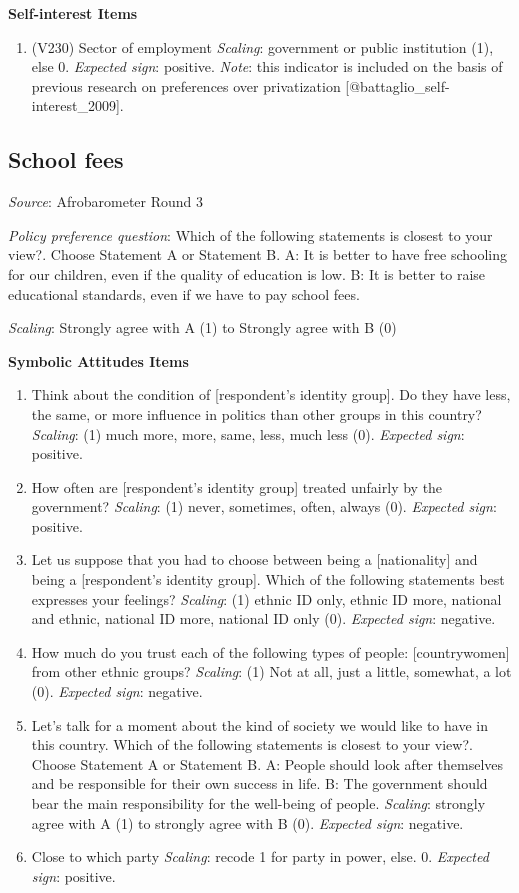 \documentclass[]{article}
\begin{document}
\textbf{Self-interest Items }

\begin{enumerate}
 \item (V230) Sector of employment \textit{Scaling}: government or public institution (1), else 0. \textit{Expected sign}: positive. \textit{Note}: this indicator is included on the basis of previous research on preferences over privatization [@battaglio_self-interest_2009].
\end{enumerate}

\subsection{School fees}\label{school-fees}

\textit{Source}: Afrobarometer Round 3

\textit{Policy preference question}: Which of the following statements
is closest to your view?. Choose Statement A or Statement B. A: It is
better to have free schooling for our children, even if the quality of
education is low. B: It is better to raise educational standards, even
if we have to pay school fees.

\textit{Scaling}: Strongly agree with A (1) to Strongly agree with B (0)

\textbf{Symbolic Attitudes Items}

\begin{enumerate}
  \item Think about the condition of [respondent’s identity group]. Do they have less, the same, or more influence in politics than other groups in this country? \textit{Scaling}: (1) much more, more, same, less, much less (0).  \textit{Expected sign}: positive.
  \item How often are [respondent’s identity group] treated unfairly by the government? \textit{Scaling}: (1) never, sometimes, often, always (0).  \textit{Expected sign}: positive.
  \item Let us suppose that you had to choose between being a [nationality] and being a [respondent’s identity group]. Which of the following statements best expresses your feelings? \textit{Scaling}: (1) ethnic ID only, ethnic ID more, national and ethnic, national ID more, national ID only (0).  \textit{Expected sign}: negative.
  \item How much do you trust each of the following types of people: [countrywomen] from other ethnic groups? \textit{Scaling}: (1) Not at all, just a little, somewhat, a lot (0).  \textit{Expected sign}: negative.
  \item Let’s talk for a moment about the kind of society we would like to have in this country. Which of the following statements is closest to your view?. Choose Statement A or Statement B. A: People should look after themselves and be responsible for their own success in life. B: The government should bear the main responsibility for the well-being of people. \textit{Scaling}: strongly agree with A (1) to strongly agree with B (0).  \textit{Expected sign}: negative.
  \item Close to which party \textit{Scaling}: recode 1 for party in power, else.  0. \textit{Expected sign}: positive.
\end{enumerate}
\end{document}
